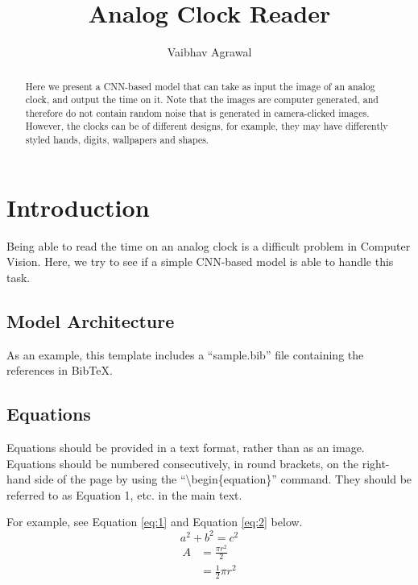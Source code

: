 \documentclass{article}
\title{Analog Clock Reader}
\author{Vaibhav Agrawal}
\affil{Center for Visual Information Technology, \\ International Institute of Information Technology, Hyderabad}
\date{}
\begin{document}
\maketitle

\begin{abstract}
Here we present a CNN-based model that can take as input the image of an analog clock, and output the time on it. Note that the images are computer generated, and therefore do not contain random noise that is generated in camera-clicked images. However, the clocks can be of different designs, for example, they may have differently styled hands, digits, wallpapers and shapes.
\end{abstract}


\section{Introduction}
Being able to read the time on an analog clock is a difficult problem in Computer Vision. Here, we try to see if a simple CNN-based model is able to handle this task. 

\subsection*{Model Architecture}

As an example, this template includes a ``sample.bib'' file containing the references in BibTeX.

\subsection*{Equations}
Equations should be provided in a text format, rather than as an image. Equations should be numbered consecutively, in round brackets, on the right-hand side of the page by using the ``\textbackslash begin\{equation\}'' command. They should be referred to as Equation 1, etc. in the main text.

\medskip For example, see Equation \ref{eq:1} and Equation \ref{eq:2} below.
\begin{equation} \label{eq:1}
    a^2 + b^2 = c^2
\end{equation}
\begin{equation} \label{eq:2}
\begin{split}
A & = \frac{\pi r^2}{2} \\
 & = \frac{1}{2} \pi r^2
\end{split}
\end{equation}
\end{document}
